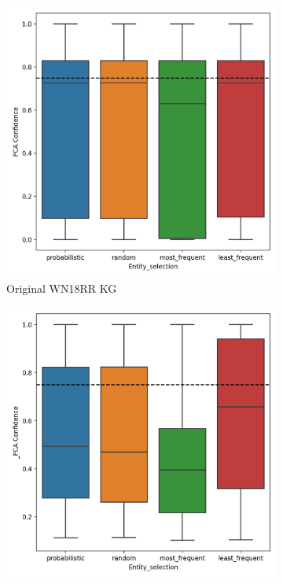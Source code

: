 \begin{figure}[htbp]
\centering
\begin{subfigure}{.5\textwidth}
  \centering
  \includegraphics[width=1\linewidth]{figures/results/entity_selection/PCA-entity_wn18rr.png}
  \caption{Original WN18RR KG}
  \label{fig:PCA-entity_wn18rr_boxplot_sub}
\end{subfigure}%
\begin{subfigure}{.5\textwidth}
  \centering
  \includegraphics[width=1\linewidth]{figures/results/entity_selection/_PCA-entity_wn18rr.png}

\end{subfigure}
\end{figure}
